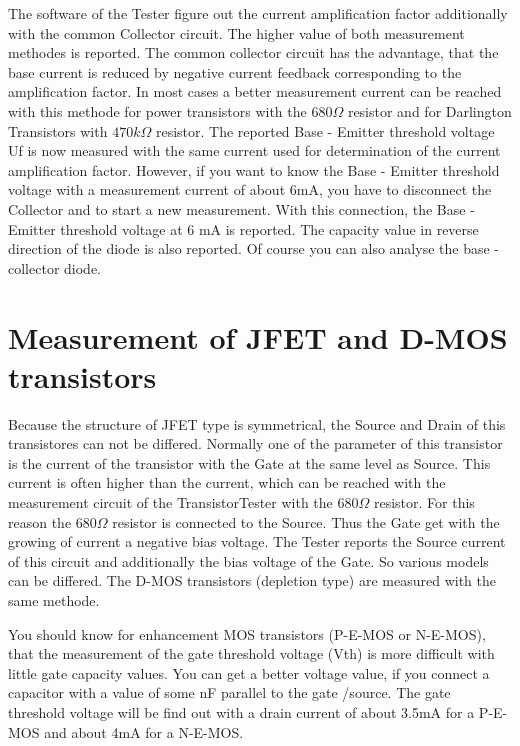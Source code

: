 The software of the Tester figure out the current amplification factor additionally with the common Collector circuit.
The higher value of both measurement methodes is reported.
The common collector circuit has the advantage, that the base current is reduced by negative current feedback corresponding
to the amplification factor. 
In most cases a better measurement current can be reached with this methode for power transistors
with the \(680 \Omega\) resistor and for Darlington Transistors with \(470 k\Omega\) resistor.
The reported Base - Emitter threshold voltage Uf is now measured with the same current used 
for determination of the current amplification factor.
However, if you want to know the Base - Emitter threshold voltage with a measurement current of about 6mA,
you have to disconnect the Collector and to start a new measurement.
With this connection, the Base - Emitter threshold voltage at 6 mA is reported. The capacity value
in reverse direction of the diode is also reported.
Of course you can also analyse the base - collector diode.

\section{Measurement of JFET and D-MOS transistors}
Because the structure of JFET type is symmetrical, the Source and Drain of this transistores can not
be differed.
Normally one of the parameter of this transistor is the current of the transistor with the Gate at the same level as Source.
This current is often higher than the current, which can be reached with the measurement circuit of the TransistorTester
with the \(680 \Omega\) resistor.
For this reason the \(680 \Omega\) resistor is connected to the Source. Thus the Gate get with the growing of current a negative
bias voltage.
The Tester reports the Source current of this circuit and additionally the bias voltage of the Gate.
So various models can be differed.
The D-MOS transistors (depletion type) are measured with the same methode.

You should know for enhancement MOS transistors (P-E-MOS or N-E-MOS), that the measurement of the gate threshold voltage (Vth)
is more difficult with little gate capacity values. You can get a better voltage value, if you connect a capacitor with a value
of some nF parallel to the gate /source.
The gate threshold voltage will be find out with a drain current of about 3.5mA for a P-E-MOS and about 4mA for a N-E-MOS.

